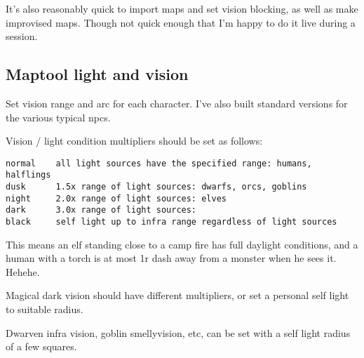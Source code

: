 It's also reasonably quick to import maps and set vision blocking, as well as make improvised maps. Though not quick enough that I'm happy to do it live during a session.


\subsection*{Maptool light and vision}
Set vision range and arc for each character. I've also built standard versions for the various typical npcs.

Vision / light condition multipliers should be set as follows:
\small\begin{verbatim}
normal    all light sources have the specified range: humans, halflings
dusk      1.5x range of light sources: dwarfs, orcs, goblins
night     2.0x range of light sources: elves
dark      3.0x range of light sources:
black     self light up to infra range regardless of light sources
\end{verbatim}\normalsize

This means an elf standing close to a camp fire has full daylight conditions, and a human with a torch is at most 1r dash away from a monster when he sees it. Hehehe.

Magical dark vision should have different multipliers, or set a personal self light to suitable radius.

Dwarven infra vision, goblin smellyvision, etc, can be set with a self light radius of a few squares.








